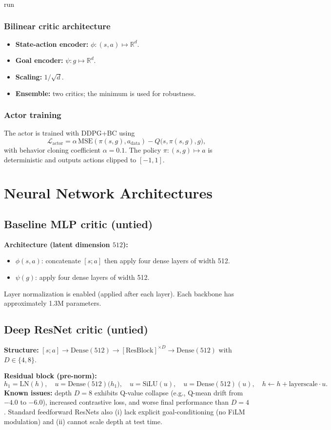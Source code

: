 run\documentclass[11pt]{article}
\begin{document}
\subsubsection{Bilinear critic architecture}
\begin{itemize}
  \item \textbf{State-action encoder:} $\phi : (s,a) \mapsto \mathbb{R}^d$.
  \item \textbf{Goal encoder:} $\psi : g \mapsto \mathbb{R}^d$.
  \item \textbf{Scaling:} $1/\sqrt{d}$.
  \item \textbf{Ensemble:} two critics; the minimum is used for robustness.
\end{itemize}

\subsubsection{Actor training}
The actor is trained with DDPG+BC using
\[
  \mathcal{L}_{\text{actor}} = \alpha\,\mathrm{MSE}(\pi(s,g), a_{\text{data}}) - Q\bigl(s,\pi(s,g),g\bigr),
\]
with behavior cloning coefficient $\alpha=0.1$. The policy $\pi:(s,g)\mapsto a$ is deterministic and outputs actions clipped to $[-1,1]$.

\section{Neural Network Architectures}
\subsection{Baseline MLP critic (untied)}
\textbf{Architecture (latent dimension $512$):}
\begin{itemize}
  \item $\phi(s,a)$: concatenate $[s;a]$ then apply four dense layers of width 512.
  \item $\psi(g)$: apply four dense layers of width 512.
\end{itemize}
Layer normalization is enabled (applied after each layer). Each backbone has approximately 1.3M parameters.

\subsection{Deep ResNet critic (untied)}
\textbf{Structure:} $[s;a] \to \mathrm{Dense}(512) \to [\mathrm{ResBlock}]^{\times D} \to \mathrm{Dense}(512)$ with $D\in\{4,8\}$.

\textbf{Residual block (pre-norm):}
\[
  h_1 = \mathrm{LN}(h),\quad
  u = \mathrm{Dense}(512)\bigl(h_1\bigr),\quad
  u = \mathrm{SiLU}(u),\quad
  u = \mathrm{Dense}(512)(u),\quad
  h \leftarrow h + \mathrm{layerscale}\cdot u.
\]
\textbf{Known issues:} depth $D=8$ exhibits Q-value collapse (e.g., Q-mean drift from $-4.0$ to $-6.0$), increased contrastive loss, and worse final performance than $D=4$. Standard feedforward ResNets also (i) lack explicit goal-conditioning (no FiLM modulation) and (ii) cannot scale depth at test time.
\end{document}

